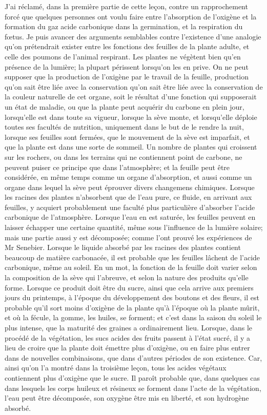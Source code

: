 J'ai réclamé, dans la première partie de cette leçon, contre un rapprochement forcé que quelques personnes ont voulu faire entre l'absorption de l'oxigène et la formation du gaz acide carbonique dans la germination, et la respiration du fœtus. Je puis avancer des arguments semblables contre l'existence d'une analogie qu'on prétendrait exister entre les fonctions des feuilles de la plante adulte, et celle des poumons de l'animal respirant. Les plantes ne végètent bien qu'en présence de la lumière; la plupart périssent lorsqu'on les en prive. On ne peut supposer que la production de l'oxigène par le travail de la feuille, production qu'on sait être liée avec la conservation qu'on sait être liée avec la conservation\setcounter{page}{34} de la couleur naturelle de cet organe, soit le résultat d'une fonction qui supposerait un état de maladie, ou que la plante peut acquérir du carbone en plein jour, lorsqu'elle est dans toute sa vigueur, lorsque la sève monte, et lorsqu'elle déploie toutes ses facultés de nutrition, uniquement dans le but de le rendre la nuit, lorsque ses feuilles sont fermées, que le mouvement de la sève est imparfait, et que la plante est dans une sorte de sommeil. Un nombre de plantes qui croissent sur les rochers, ou dans les terrains qui ne contiennent point de carbone, ne peuvent puiser ce principe que dans l'atmosphère; et la feuille peut être considérée, en même temps comme un organe d'absorption, et aussi comme un organe dans lequel la sève peut éprouver divers changemens chimiques.
Lorsque les racines des plantes n'absorbent que de l'eau pure, ce fluide, en arrivant aux feuilles, y acquiert probablement une faculté plus particulière d'absorber l'acide carbonique de l'atmosphère. Lorsque l'eau en est saturée, les feuilles peuvent en laisser échapper une certaine quantité, même sous l'influence de la lumière solaire; mais une partie aussi y est décomposée; comme l'ont prouvé les expériences de Mr Senebier.\setcounter{page}{35} Lorsque le liquide absorbé par les racines des plantes contient beaucoup de matière carbonacée, il est probable que les feuilles lâchent de l'acide carbonique, même au soleil. En un mot, la fonction de la feuille doit varier selon la composition de la sève qui l'abreuve, et selon la nature des produits qu'elle forme. Lorsque ce produit doit être du sucre, ainsi que cela arrive aux premiers jours du printemps, à l'époque du développement des boutons et des fleurs, il est probable qu'il sort moins d'oxigène de la plante qu'à l'époque où la plante mûrit, et où la fécule, la gomme, les huiles, se forment; et c'est dans la saison du soleil le plus intense, que la maturité des graines a ordinairement lieu. Lorsque, dans le procédé de la végétation, les sucs acides des fruits passent à l'état sucré, il y a lieu de croire que la plante doit émettre plus d'oxigène, ou en faire plus entrer dans de nouvelles combinaisons, que dans d'autres périodes de son existence. Car, ainsi qu'on l'a montré dans la troisième leçon, tous les acides végétaux contiennent plus d'oxigène que le sucre. Il paroît probable que, dans quelques cas dans lesquels les corps huileux et résineux se forment dans l'acte de la végétation, l'eau peut être décomposée, son\setcounter{page}{36} oxygène être mis en liberté, et son hydrogène absorbé.

